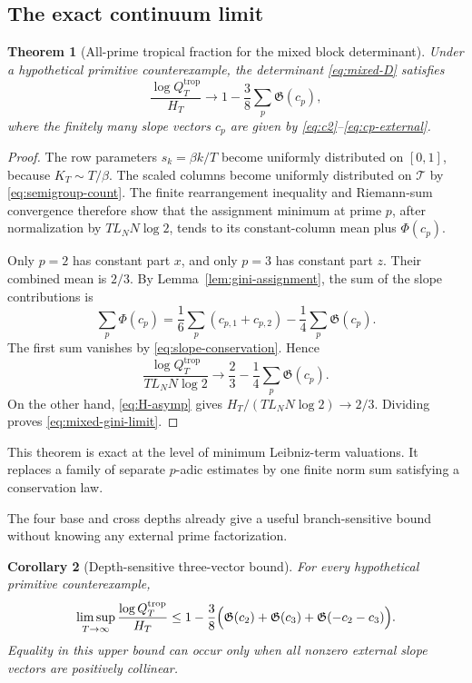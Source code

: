 \documentclass[11pt,oneside]{article}
\newtheorem{theorem}{Theorem}[section]
\newtheorem{corollary}[theorem]{Corollary}
\theoremstyle{definition}
\theoremstyle{remark}
\newcommand{\DeltaTri}{\mathcal T}
\begin{document}
\subsection{The exact continuum limit}

\begin{theorem}[All-prime tropical fraction for the mixed block determinant]
\label{thm:mixed-gini}
Under a hypothetical primitive counterexample, the determinant \eqref{eq:mixed-D} satisfies
\begin{equation}\label{eq:mixed-gini-limit}
 \frac{\log Q_T^{\mathrm{trop}}}{H_T}
 \longrightarrow
 1-\frac38\sum_p\mathfrak G(c_p),
\end{equation}
where the finitely many slope vectors $c_p$ are given by
\eqref{eq:c2}--\eqref{eq:cp-external}.
\end{theorem}

\begin{proof}
The row parameters $s_k=\beta k/T$ become uniformly distributed on $[0,1]$, because
$K_T\sim T/\beta$.  The scaled columns become uniformly distributed on $\DeltaTri$ by
\eqref{eq:semigroup-count}.  The finite rearrangement inequality and Riemann-sum convergence
therefore show that the assignment minimum at prime $p$, after normalization by
$TL_NN\log2$, tends to its constant-column mean plus $\Phi(c_p)$.

Only $p=2$ has constant part $x$, and only $p=3$ has constant part $z$.  Their combined mean is
$2/3$.  By Lemma~\ref{lem:gini-assignment}, the sum of the slope contributions is
\[
 \sum_p\Phi(c_p)
 =\frac16\sum_p(c_{p,1}+c_{p,2})
  -\frac14\sum_p\mathfrak G(c_p).
\]
The first sum vanishes by \eqref{eq:slope-conservation}.  Hence
\[
 \frac{\log Q_T^{\mathrm{trop}}}{TL_NN\log2}
 \longrightarrow
 \frac23-\frac14\sum_p\mathfrak G(c_p).
\]
On the other hand, \eqref{eq:H-asymp} gives
$H_T/(TL_NN\log2)\to2/3$.  Dividing proves
\eqref{eq:mixed-gini-limit}.
\end{proof}

This theorem is exact at the level of minimum Leibniz-term valuations.  It replaces a family
of separate $p$-adic estimates by one finite norm sum satisfying a conservation law.

The four base and cross depths already give a useful branch-sensitive bound without knowing
any external prime factorization.

\begin{corollary}[Depth-sensitive three-vector bound]\label{cor:three-vector}
For every hypothetical primitive counterexample,
\begin{equation}\label{eq:three-vector}
 \limsup_{T\to\infty}
 \frac{\log Q_T^{\mathrm{trop}}}{H_T}
 \le
 1-\frac38\Bigl(
   \mathfrak G(c_2)+\mathfrak G(c_3)
   +\mathfrak G(-c_2-c_3)\Bigr).
\end{equation}
Equality in this upper bound can occur only when all nonzero external slope vectors are
positively collinear.
\end{corollary}
\end{document}
